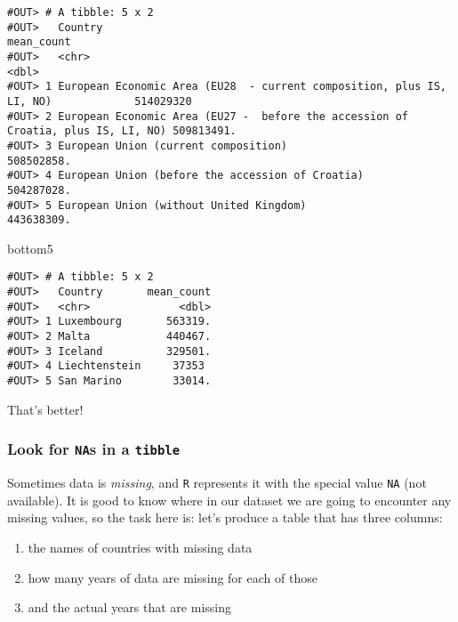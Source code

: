 \documentclass[]{book}
\newenvironment{Shaded}{\begin{snugshade}}{\end{snugshade}}
\newcommand{\NormalTok}[1]{#1}
\providecommand{\tightlist}{%
  \setlength{\itemsep}{0pt}\setlength{\parskip}{0pt}}
\begin{document}
\begin{verbatim}
#OUT> # A tibble: 5 x 2
#OUT>   Country                                                                           mean_count
#OUT>   <chr>                                                                                  <dbl>
#OUT> 1 European Economic Area (EU28  - current composition, plus IS, LI, NO)             514029320 
#OUT> 2 European Economic Area (EU27 -  before the accession of Croatia, plus IS, LI, NO) 509813491.
#OUT> 3 European Union (current composition)                                              508502858.
#OUT> 4 European Union (before the accession of Croatia)                                  504287028.
#OUT> 5 European Union (without United Kingdom)                                           443638309.
\end{verbatim}

\begin{Shaded}
\begin{Highlighting}[]
\NormalTok{bottom5}
\end{Highlighting}
\end{Shaded}

\begin{verbatim}
#OUT> # A tibble: 5 x 2
#OUT>   Country       mean_count
#OUT>   <chr>              <dbl>
#OUT> 1 Luxembourg       563319.
#OUT> 2 Malta            440467.
#OUT> 3 Iceland          329501.
#OUT> 4 Liechtenstein     37353 
#OUT> 5 San Marino        33014.
\end{verbatim}

That's better!

\hypertarget{look-for-nas-in-a-tibble}{%
\subsubsection*{\texorpdfstring{Look for \texttt{NA}s in a \texttt{tibble}}{Look for NAs in a tibble}}\label{look-for-nas-in-a-tibble}}

Sometimes data is \emph{missing}, and \texttt{R} represents it with the special value \texttt{NA} (not available). It is good to know where in our dataset we are going to encounter any missing values, so the task here is: let's produce a table that has three columns:

\begin{enumerate}
\def\labelenumi{\arabic{enumi}.}
\tightlist
\item
  the names of countries with missing data
\item
  how many years of data are missing for each of those
\item
  and the actual years that are missing
\end{enumerate}
\end{document}

